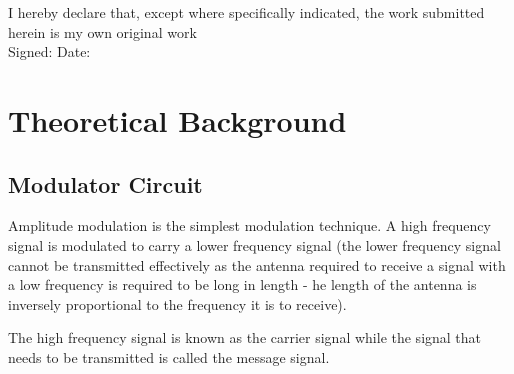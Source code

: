 \documentclass[12pt, a4paper]{article}
\begin{document}
	\begin{titlepage}
		\vspace*{1.5cm}
		\vspace*{1.5cm}
		\vspace*{1.5cm}
		\vspace*{0.5cm}
		\vspace*{0.1cm}
		\vspace*{0.1cm}
		\vspace*{0.1cm}
		\vspace*{0.3cm}
		\makebox[\textwidth]{\today}
		\vfill
		\noindent I hereby declare that, except where specifically indicated, the work submitted herein is my own original work\\
		Signed: \hspace*{5cm} Date:
	\end{titlepage}

	\tableofcontents
	\newpage

\section{Theoretical Background}
\label{sec:theoretical_background}

	\subsection{Modulator Circuit}
		Amplitude modulation is the simplest modulation technique. A high frequency signal is modulated to carry a lower frequency signal (the lower frequency signal cannot be transmitted effectively as the antenna required to receive a signal with a low frequency is required to be long in length - he length of the antenna is inversely proportional to the frequency it is to receive).

		The high frequency signal is known as the carrier signal while the signal that needs to be transmitted is called the message signal. 
\end{document}
